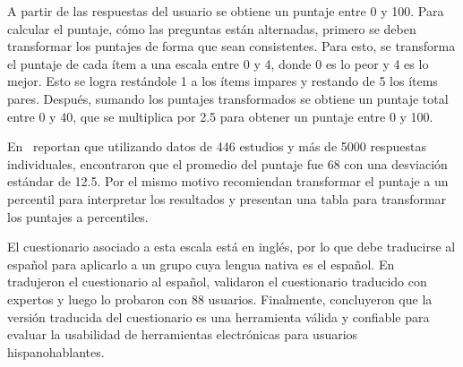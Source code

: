 A partir de las respuestas del usuario se obtiene un puntaje entre 0 y 100. Para calcular el puntaje, cómo las preguntas están alternadas, primero se deben transformar los puntajes de forma que sean consistentes. Para esto, se transforma el puntaje de cada ítem a una escala entre 0 y 4, donde 0 es lo peor y 4 es lo mejor. Esto se logra restándole 1 a los ítems impares y restando de 5 los ítems pares. Después, sumando los puntajes transformados se obtiene un puntaje total entre 0 y 40, que se multiplica por 2.5 para obtener un puntaje entre 0 y 100.

En~\cite{quantifying-the-user-experience} reportan que utilizando datos de 446 estudios y más de 5000 respuestas individuales, encontraron que el promedio del puntaje fue 68 con una desviación estándar de 12.5. Por el mismo motivo recomiendan transformar el puntaje a un percentil para interpretar los resultados y presentan una tabla para transformar los puntajes a percentiles.

El cuestionario asociado a esta escala está en inglés, por lo que debe traducirse al español para aplicarlo a un grupo cuya lengua nativa es el español. En~\cite{spanish-sus} tradujeron el cuestionario al español, validaron el cuestionario traducido con expertos y luego lo probaron con 88 usuarios. Finalmente, concluyeron que la versión traducida del cuestionario es una herramienta válida y confiable para evaluar la usabilidad de herramientas electrónicas para usuarios hispanohablantes.
